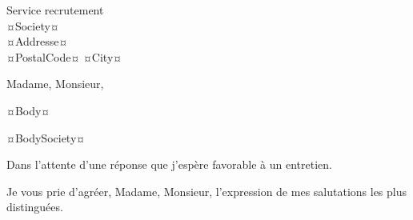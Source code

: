 \documentclass[
    french,
    sender,
    paper=a4,
    version=last,
    fontsize=9pt,
    DIV=12,
    BCOR=0mm
]{scrlttr2}
\begin{document}




\begin{letter}{
    Service recrutement\\
    ¤Society¤\\
    ¤Addresse¤\\
    ¤PostalCode¤ ¤City¤
}

\opening{Madame, Monsieur,}


¤Body¤

¤BodySociety¤

Dans l’attente d’une réponse que j'espère favorable à un entretien.

\closing{Je vous prie d’agréer, Madame, Monsieur, l’expression de mes salutations les plus distinguées.\\}

\end{letter}
\end{document}
